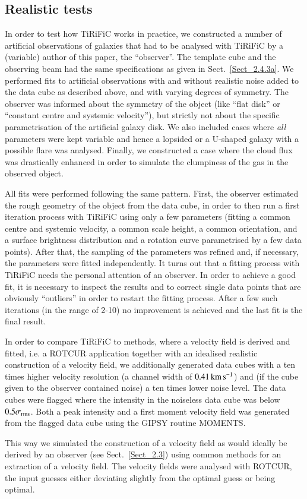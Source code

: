 \documentclass[oldversion]{aa}
\newcommand{\cng}[1]{{#1}}
\newcommand{\cngs}[1]{{#1}}
\begin{document}
{\subsection{Realistic tests}
\label{Sect_2.4.3b}
In order to test how TiRiFiC works in practice, we constructed a
number of artificial  observations of galaxies that had to be
analysed with TiRiFiC by a (variable) author of this paper, the
``observer''. The template cube and the \cng{observing} beam had the
same specifications as given in Sect.~{\ref{Sect_2.4.3a}}. We
performed fits to artificial observations with and without realistic noise
added to the data cube as described above, and with varying degrees of
symmetry. The observer was informed about the symmetry of the object
(like ``flat disk'' or ``constant centre and systemic velocity''), but
strictly not about the specific parametrisation of the artificial galaxy
disk. We also included cases where \emph{all} parameters were kept
variable and hence a lopsided or a U-shaped galaxy with a possible
flare was analysed. Finally, we constructed a case where the cloud
flux was drastically enhanced in order to simulate the clumpiness of
the gas in the observed object.

All fits were performed following the same pattern. First, the
observer estimated the rough geometry of the object from the data
cube, in order to then run a first iteration process with TiRiFiC
using only a few parameters (fitting a common centre and systemic
velocity, a common scale height, a common orientation, and a surface
brightness distribution and a rotation curve parametrised by a few
data points). After that, the sampling of the parameters was refined
and, if necessary, the parameters were fitted independently. It turns
out that a fitting process with TiRiFiC needs the personal attention
of an observer. In order to achieve a good fit, it is necessary to
inspect the results and to correct single data points that are
obviously ``outliers'' in order to restart the fitting process. After
a few such iterations (in the range of 2-10) no improvement is achieved
and the last fit is the final result. 

In order to compare TiRiFiC to methods, \cngs{where a velocity field is derived and fitted}, i.e. a ROTCUR \cngs{application together with an idealised realistic construction of a velocity field}, we additionally generated data
cubes with a ten times higher velocity resolution \cngs{(a channel width of $0.41\,{\rm km}\,{\rm s}^{-1}$)} and (if the cube
given to the observer contained noise) a ten times lower noise
level. The data cubes were flagged where the intensity in the
noiseless data cube was below $0.5 \sigma_{\rm rms}$. Both a peak intensity and a first moment velocity field was
generated from the flagged
data cube using the GIPSY routine MOMENTS. \cngs{This way we simulated the construction of a velocity field as would ideally be derived by an observer \cngs{(see Sect.~\ref{Sect_2.3}) using common methods for an extraction of a velocity field. The velocity fields were} analysed
with ROTCUR, the input guesses either deviating slightly from
the optimal guess or being optimal. 

}}
\end{document}
